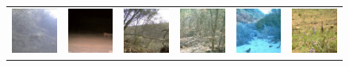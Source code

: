 \begin{figure}[htp!]
\begin{tabularx}{\textwidth}{Y Y Y !{\space} Y Y Y !{\space}}
        \includegraphics{gfx/unconditional-diffusion-sampling-caltech-qual/rgb_585dab96-23d2-11e8-a6a3-ec086b02610b.jpg} & \includegraphics{gfx/unconditional-diffusion-sampling-caltech-qual/diffusion_00003.png} & \includegraphics{gfx/unconditional-diffusion-sampling-caltech-qual/rgb_585f4d99-23d2-11e8-a6a3-ec086b02610b.jpg} & \includegraphics{gfx/unconditional-diffusion-sampling-caltech-qual/diffusion_00004.png} & \includegraphics{gfx/unconditional-diffusion-sampling-caltech-qual/rgb_585f4fbd-23d2-11e8-a6a3-ec086b02610b.jpg} & \includegraphics{gfx/unconditional-diffusion-sampling-caltech-qual/diffusion_00005.png} \\

\end{tabularx}
\end{figure}
